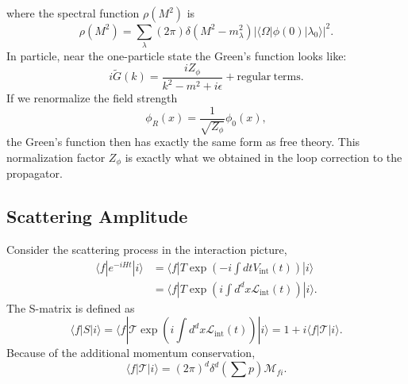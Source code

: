 where the spectral function $\rho(M^2)$ is
\begin{equation*}
	\rho(M^2) = \sum_\lambda(2\pi)\delta(M^2-m_\lambda^2)|\langle\Omega|\phi(0)|\lambda_0\rangle|^2.
\end{equation*}
In particle, near the one-particle state the Green's function looks like:
\begin{equation*}
	i\tilde G(k) = \frac{iZ_{\phi}}{k^2-m^2+i\epsilon} + \mathrm{regular\ terms}.
\end{equation*}
If we renormalize the field strength 
\begin{equation*}
	\phi_R(x) = \frac{1}{\sqrt{Z_\phi}}\phi_0(x),
\end{equation*}
the Green's function then has exactly the same form as free theory.
This normalization factor $Z_\phi$ is exactly what we obtained in the loop correction to the propagator.



\subsection{Scattering Amplitude}

Consider the scattering process in the interaction picture,
\begin{equation}
\begin{aligned}
	\langle f| e^{-iHt} |i\rangle &= \langle f| T \exp \left(-i\int dt V_{\mathrm{int}}(t) \right)|i\rangle \\
	&= \langle f| T \exp \left(i\int d^d x \mathcal{L}_{\mathrm{int}}(t) \right)|i\rangle.
\end{aligned}
\end{equation}
The S-matrix is defined as
\begin{equation}
	\langle f|S|i\rangle 
	= \langle f|\mathcal{T} \exp \left(i\int d^d x \mathcal{L}_{\mathrm{int}}(t) \right)|i\rangle 
	= 1 + i \langle f|\mathcal{T}|i\rangle .
\end{equation}
Because of the additional momentum conservation,
\begin{equation}
	\langle f|\mathcal{T}|i\rangle = (2\pi)^d \delta^d\left(\sum p\right) \mathcal M_{fi}.
\end{equation}


